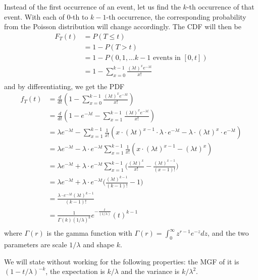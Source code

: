 \documentclass[11pt, a4paper, oneside]{book}
\theoremstyle{definition}
\newcommand{\gammaf}[1]{\Gamma(#1)}
\begin{document}
\noindent Instead of the first occurrence of an event, let us find the $k$-th occurrence of that event. With each of $0$-th to $k-1$-th occurrence, the corresponding probability from the Poisson distribution will change accordingly. The CDF will then be
\begin{equation*}
\begin{split}
F_T(t) &= P(T \le t) \\
&= 1 - P(T>t) \\
&= 1 - P(0, 1, \dots k-1 \text{ events in } [0,t]) \\
&= 1 - \sum_{x=0}^{k-1} \frac{(\lambda t)^x e^{-\lambda t}}{x!} \\
\end{split}
\end{equation*}
and by differentiating, we get the PDF 
\begin{equation*}
\begin{split}
f_T(t) &= \frac{d}{dt} (1 - \sum_{x=0}^{k-1} \frac{(\lambda t)^x e^{-\lambda t}}{x!} ) \\
&= \frac{d}{dt} (1 - e^{-\lambda t} - \sum_{x=1}^{k-1} \frac{(\lambda t)^x e^{-\lambda t}}{x!}) \\
&= \lambda e^{-\lambda t} - \sum_{x=1}^{k-1} \frac{1}{x!} (x\cdot (\lambda t)^{x-1}\cdot \lambda \cdot e^{-\lambda t} - \lambda \cdot (\lambda t)^{x}\cdot e^{-\lambda t}) \\
&= \lambda e^{-\lambda t} - \lambda \cdot e^{-\lambda t} \sum_{x=1}^{k-1} \frac{1}{x!} (x\cdot (\lambda t)^{x-1} - (\lambda t)^{x}) \\
&= \lambda e^{-\lambda t} + \lambda \cdot e^{-\lambda t} \sum_{x=1}^{k-1}  \Big(\frac{(\lambda t)^{x}}{x!} - \frac{(\lambda t)^{x-1}}{(x-1)!}\Big)\\
&= \lambda e^{-\lambda t} + \lambda \cdot e^{-\lambda t} \Big( \frac{(\lambda t)^{k-1}}{(k-1)!} - 1 \Big) \\
&= \frac{\lambda \cdot e^{-\lambda t} (\lambda t)^{k-1}}{(k-1)!} \\
&= \frac{1}{\gammaf{k} (1/\lambda)^k} e^{-\frac{t}{(1/\lambda)}} (t)^{k-1} \\
\end{split}
\end{equation*}
where $\gammaf{r}$ is the gamma function with $\gammaf{r} = \int_0^{\infty} z^{r-1}e^{-z}dz$, and the two parameters are scale $1/\lambda$ and shape $k$.

\noindent We will state without working for the following properties: the MGF of it is $(1-t/\lambda)^{-k}$, the expectation is $k/\lambda$ and the variance is $k/\lambda^2$.
\end{document}

